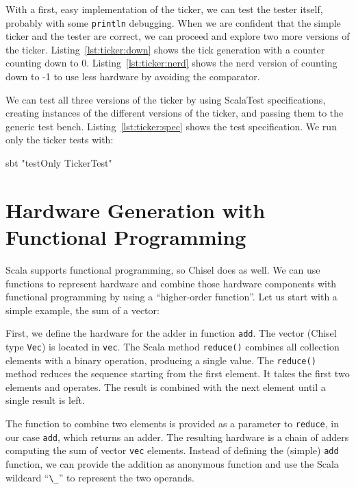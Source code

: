 \documentclass[%
    10pt,
    headinclude, footexclude,
    openright, %
    notitlepage,
    cleardoubleempty,
    headsepline,
    pointlessnumbers,
    bibtotoc, idxtotoc,
    ]{scrbook}
\newcommand{\code}[1]{{\lstinline[basicstyle=\small\ttfamily]{#1}}}
\begin{document}
With a first, easy implementation of the ticker, we can test the tester
itself, probably with some \code{println} debugging. When we are confident that
the simple ticker and the tester are correct, we can proceed and explore
two more versions of the ticker. Listing~\ref{lst:ticker:down} shows the tick
generation with a counter counting down to 0.
Listing~\ref{lst:ticker:nerd} shows the nerd version of counting down to -1 to use
less hardware by avoiding the comparator.



We can test all three versions of the ticker by using ScalaTest specifications,
creating instances of the different versions of the ticker, and passing them
to the generic test bench. Listing~\ref{lst:ticker:spec} shows the test specification.
We run only the ticker tests with:
\begin{chisel}
sbt "testOnly TickerTest"
\end{chisel}


\section{Hardware Generation with Functional Programming}
\label{sec:functional}


Scala supports functional programming, so Chisel does as well.
We can use functions to represent hardware and combine those hardware components
with functional programming by using a ``higher-order function''.
Let us start with a simple example, the sum of a vector:


First, we define the hardware for the adder in function \code{add}.
The vector (Chisel type \code{Vec}) is located in \code{vec}. The Scala method \code{reduce()} combines
all collection elements with a binary operation, producing a single value.
The \code{reduce()} method reduces the sequence starting from the first element.
It takes the first two elements and operates. The result is combined
with the next element until a single result is left.

The function to combine two elements is provided as a parameter to \code{reduce}, in our case \code{add},
which returns an adder. The resulting hardware is a chain of adders computing
the sum of vector \code{vec} elements.
Instead of defining the (simple) \code{add} function, we can provide the addition
as anonymous function and use the Scala wildcard ``\code{\_}'' to represent the
two operands.
\end{document}
